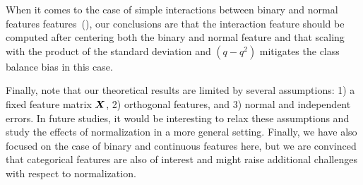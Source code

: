When it comes to the case of simple interactions between binary and normal features
features~(), our conclusions are that the interaction
feature should be computed after centering both the binary and normal feature and that
scaling with the product of the standard deviation and \((q-q^2)\) mitigates the class
balance bias in this case.

Finally, note that our theoretical results are limited by several assumptions: 1) a fixed
feature matrix \(\boldsymbol{X}\), 2) orthogonal features, and 3) normal and independent errors.
In future studies, it would be interesting to relax these assumptions and study the effects
of normalization in a more general setting. Finally, we have also focused on the case of
binary and continuous features here, but we are convinced that categorical features are
also of interest and might raise additional challenges with respect to normalization.
